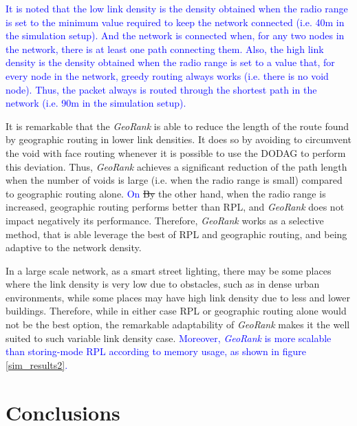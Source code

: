 \documentclass[authoryear,preprint,review,12pt]{elsarticle}
\newcommand{\rev}{\textcolor{blue}}
\begin{document}
\rev{It is noted that the low link density is the density obtained when the radio range is set to the minimum value required to keep the network connected (i.e. 40m in the simulation setup). And the network is connected when, for any two nodes in the network, there is at least one path connecting them. Also, the high link density is the density obtained when the radio range is set to a value that, for every node in the network, greedy routing always works (i.e. there is no void node). Thus, the packet always is routed through the shortest path in the network (i.e. 90m in the simulation setup).}

It is remarkable that the \textit{GeoRank} is able to reduce the length of the route found by geographic routing in lower link densities. It does so by avoiding to circumvent the void with face routing whenever it is possible to use the DODAG to perform this deviation. Thus, \textit{GeoRank} achieves a significant reduction of the path length when the number of voids is large (i.e. when the radio range is small) compared to geographic routing alone. \rev{On} \sout{By} the other hand, when the radio range is increased, geographic routing performs better than RPL, and \textit{GeoRank} does not impact negatively its performance. Therefore, \textit{GeoRank} works as a selective method, that is able leverage the best of RPL and geographic routing, and being adaptive to the network density.

In a large scale network, as a smart street lighting, there may be some places where the link density is very low due to obstacles, such as in dense urban environments, while some places may have high link density due to less and lower buildings. Therefore, while in either case RPL or geographic routing alone would not be the best option, the remarkable adaptability of \textit{GeoRank} makes it the well suited to such variable link density case. \rev{Moreover, \textit{GeoRank} is more scalable than storing-mode RPL according to memory usage, as shown in figure \ref{sim_results2}.}


\section{Conclusions}
\label{secConclusion}
\end{document}
